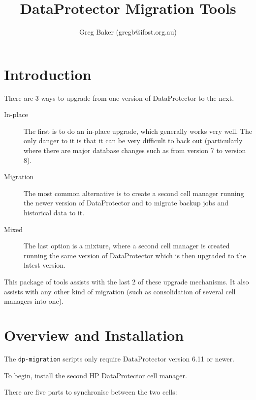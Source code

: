 \documentclass{article}
\title{DataProtector Migration Tools}
\author{Greg Baker (gregb@ifost.org.au)}
\begin{document}
\maketitle
\tableofcontents

\section*{Introduction}

There are 3 ways to upgrade from one version of DataProtector to the next. 

\begin{description}
\item[In-place] The first is to do an in-place upgrade, which generally works very well. The only danger to it is that it can be very difficult to back out (particularly where there are major database changes such as from version 7 to version 8).

\item[Migration] The most common alternative is to create a second cell manager running the newer version of DataProtector and to migrate backup jobs and historical data to it.

\item[Mixed]  The last option is a mixture, where a second cell manager is created running the same version of DataProtector which is then upgraded to the latest version.

\end{description}

This package of tools assists with the last 2 of these upgrade mechanisms. It also assists with any other kind of migration (such as consolidation of several cell managers into one).


\section*{Overview and Installation}

The {\tt dp-migration} scripts only require DataProtector version 6.11 or newer.

To begin, install the second HP DataProtector cell manager.

There are five parts to synchronise between the two cells:
\end{document}
